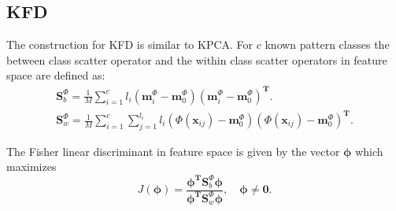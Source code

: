 \documentclass[7 pt]{article}
\begin{document}
\begin{multicols}{2}
 \subsection{KFD}
The construction for KFD is similar to KPCA. 
For $c$ known pattern classes the between class scatter operator and the within class scatter operators in feature space are defined as:
\begin{gather}
\mathbf{S}_{b}^{\Phi}=\frac{1}{M}\sum_{i=1}^{c} l_{i}(\mathbf{m}_{i}^{\Phi}-\mathbf{m}_{0}^{\Phi} )(\mathbf{m}_{i}^{\Phi}-\mathbf{m}_{0}^{\Phi})^{\mathbf{T}}. \\
\mathbf{S}_{w}^{\Phi}=\frac{1}{M}\sum_{i=1}^{c}\sum_{j=1}^{l_{i}} l_{i}(\Phi({\mathbf{x}_{ij}})-\mathbf{m}_{0}^{\Phi} )(\Phi({\mathbf{x}_{ij}})-\mathbf{m}_{0}^{\Phi})^{\mathbf{T}}. 
\end{gather} 
 
 The Fisher linear discriminant in feature space is given by the vector $\boldsymbol{\phi}$ which maximizes
\begin{equation}
J(\boldsymbol{\phi})= \frac{\boldsymbol{\phi}^{\mathbf{T}} \mathbf{S}_{b}^{\Phi}\boldsymbol{\phi}}{\boldsymbol{\phi}^{\mathbf{T}} \mathbf{S}_{w}^{\Phi}\boldsymbol{\phi}}, \quad \boldsymbol{\phi}\neq \mathbf{0}.
\end{equation} 

\end{multicols}
\end{document}
